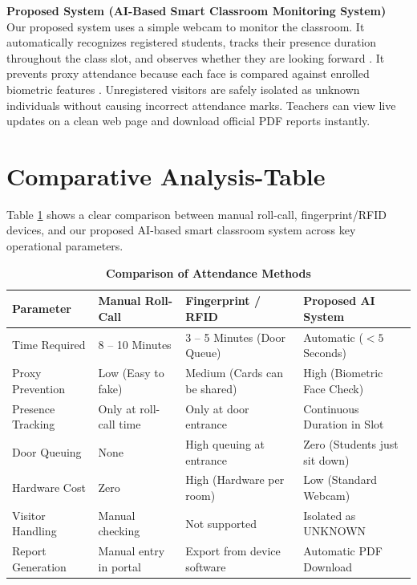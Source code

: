 \documentclass[10pt]{report}
\begin{document}
\noindent\textbf{Proposed System (AI-Based Smart Classroom Monitoring System)}\\
Our proposed system uses a simple webcam to monitor the classroom. It automatically recognizes registered students, tracks their presence duration throughout the class slot, and observes whether they are looking forward \cite{ghodekar2023activeness}. It prevents proxy attendance because each face is compared against enrolled biometric features \cite{george2024edgeface}. Unregistered visitors are safely isolated as unknown individuals without causing incorrect attendance marks. Teachers can view live updates on a clean web page and download official PDF reports instantly.

\section{Comparative Analysis-Table}
\hspace{0.5cm}Table \ref{tab:comparison} shows a clear comparison between manual roll-call, fingerprint/RFID devices, and our proposed AI-based smart classroom system across key operational parameters.

\begin{table}[H]
\caption{\textbf{Comparison of Attendance Methods}}
\label{tab:comparison}
\vspace{0.3cm}
\centering
\renewcommand{\arraystretch}{1.3}
\begin{tabular}{|p{3.2cm}|p{3.8cm}|p{4.0cm}|p{4.2cm}|}
\hline
\textbf{Parameter} & \textbf{Manual Roll-Call} & \textbf{Fingerprint / RFID} & \textbf{Proposed AI System} \\
\hline
Time Required & 8 -- 10 Minutes & 3 -- 5 Minutes (Door Queue) & Automatic ($< 5$ Seconds) \\
\hline
Proxy Prevention & Low (Easy to fake) & Medium (Cards can be shared) & High (Biometric Face Check) \\
\hline
Presence Tracking & Only at roll-call time & Only at door entrance & Continuous Duration in Slot \\
\hline
Door Queuing & None & High queuing at entrance & Zero (Students just sit down) \\
\hline
Hardware Cost & Zero & High (Hardware per room) & Low (Standard Webcam) \\
\hline
Visitor Handling & Manual checking & Not supported & Isolated as UNKNOWN \\
\hline
Report Generation & Manual entry in portal & Export from device software & Automatic PDF Download \\
\hline
\end{tabular}
\end{table}
\end{document}
